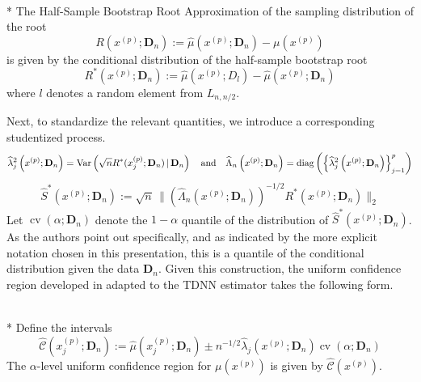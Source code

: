 \begin{boxD}
	\begin{dfn}\mbox{}\\*
		The Half-Sample Bootstrap Root Approximation of the sampling distribution of the root
		\begin{equation}
			R\left(x^{(p)}; \mathbf{D}_n\right)
			:= \hat{\mu}\left(x^{(p)}; \mathbf{D}_n\right) - \mu(x^{(p)})
		\end{equation}
		is given by the conditional distribution of the half-sample bootstrap root
		\begin{equation}
			R^{*}\left(x^{(p)}; \mathbf{D}_n\right)
			:= \hat{\mu}\left(x^{(p)}; D_l\right) - \hat{\mu}\left(x^{(p)}; \mathbf{D}_n\right)
		\end{equation}
		where $l$ denotes a random element from $L_{n, n/2}$.
	\end{dfn}
\end{boxD}

Next, to standardize the relevant quantities, we introduce a corresponding studentized process.
\begin{equation}
	\widehat{\lambda}_{j}^{2}\left(x^{(p)}; \mathbf{D}_n\right) = \text{Var}\left(\sqrt{n} R^{*}(x^{(p)}_{j}; \mathbf{D}_n) \, | \, \mathbf{D}_n\right)
	\quad \text{and} \quad
	\widehat{\Lambda}_n\left(x^{(p)}; \mathbf{D}_n\right) = \operatorname{diag}\left(\left\{\widehat{\lambda}_{j}^{2}\left(x^{(p)}; \mathbf{D}_n\right)\right\}_{j = 1}^{p}\right)
\end{equation}
\begin{equation}
	\hat{S}^{*}\left(x^{(p)}; \mathbf{D}_n\right)
	:= \sqrt{n} \, \Big\| \left(\hat{\Lambda}_n\left(x^{(p)}; \mathbf{D}_n\right)\right)^{-1/2} R^{*}\left(x^{(p)}; \mathbf{D}_n\right)\Big\|_{2}
\end{equation}
Let $\operatorname{cv}\left(\alpha; \mathbf{D}_n\right)$ denote the $1-\alpha$ quantile of the distribution of $\hat{S}^{*}\left(x^{(p)}; \mathbf{D}_n\right)$.
As the authors point out specifically, and as indicated by the more explicit notation chosen in this presentation, this is a quantile of the conditional distribution given the data $\mathbf{D}_n$.
Given this construction, the uniform confidence region developed in \citet{ritzwoller_simultaneous_2024} adapted to the TDNN estimator takes the following form.

\begin{boxD}
	\begin{thm}\mbox{}\\*
		Define the intervals
		\begin{equation}
			\hat{\mathcal{C}}\left(x^{(p)}_j; \mathbf{D}_n\right)
			:= \hat{\mu}\left(x^{(p)}_{j}; \mathbf{D}_n\right) \pm
			n^{-1/2} \hat{\lambda}_{j}\left(x^{(p)}; \mathbf{D}_n\right)\operatorname{cv}\left(\alpha; \mathbf{D}_n\right)
		\end{equation}
		The $\alpha$-level uniform confidence region for $\mu\left(x^{(p)}\right)$ is given by $\hat{\mathcal{C}}\left(x^{(p)}\right)$.
	\end{thm}
\end{boxD}

